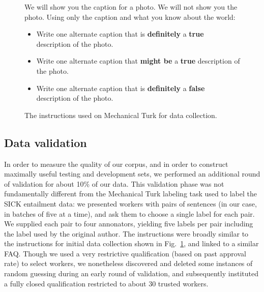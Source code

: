 \begin{figure}
\begin{framed}
\small
We will show you the caption for a photo. We will not show you the photo. Using only the caption and what you know about the world:
\begin{itemize}
\item Write one alternate caption that is \textbf{definitely} a \textbf{true} description of the photo. 
\item Write one alternate caption that \textbf{might be} a \textbf{true} description of the photo. 
\item Write one alternate caption that is \textbf{definitely} a \textbf{false} description of the photo. 
\end{itemize}
\end{framed}

\caption{\label{instructions-1}The instructions used on Mechanical Turk for data collection.}
\end{figure}

\subsection{Data validation}

%
In order to measure the quality of our corpus, and in order to construct maximally useful testing and development sets, we performed an additional round of validation for about 10\% of our data.
This validation phase was not fundamentally different from the Mechanical Turk labeling task used to label the SICK entailment data: we presented workers with pairs of sentences (in our case, in batches of five at a time), and ask them to choose a single label for each pair. We supplied each pair to four annonators, yielding five labels per pair including the label used by the original author. The instructions were broadly similar to the instructions for initial data collection shown in Fig.~\ref{instructions-1}, and linked to a similar FAQ. Though we used a very restrictive qualification (based on past approval rate) to select workers, we nonetheless discovered and deleted some instances of random guessing during an early round of validation, and subsequently instituted a fully closed qualification restricted to about 30 trusted workers.

